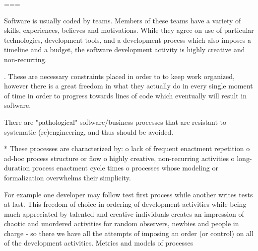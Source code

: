 ===

Software is usually coded by teams. Members of these teams have a variety of skills, experiences, 
believes and motivations. While they agree on use of particular technologies, development tools, 
and a development process which also imposes a timeline and a budget, the software development
activity is highly creative and non-recurring. 

. These are necessary constraints placed in order to to keep work organized, 
however there is a great freedom in what they actually do in every single moment of time in 
order to progress towards lines of code which eventually will result in software. 

There are "pathological" software/business processes that are resistant to systematic (re)engineering, and thus should be avoided.

    * These processes are characterized by:
          o lack of frequent enactment repetition
          o ad-hoc process structure or flow
          o highly creative, non-recurring activities
          o long-duration process enactment cycle times
          o processes whose modeling or formalization overwhelms their simplicity.

For example one developer may follow test first process while
another writes tests at last.  This freedom of choice in ordering of development activities 
while being much appreciated by talented and creative individuals creates an impression 
of chaotic and unordered activities for random observers, newbies and people in 
charge - so there we have all the attempts of imposing an order 
(or control) on all of the development activities. Metrics and models of processes